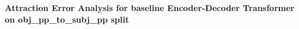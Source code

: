 \documentclass[11pt]{article}
\begin{document}
\textbf{Attraction Error Analysis for \cite{Wu2023} baseline Encoder-Decoder Transformer on obj\_pp\_to\_subj\_pp split}



\end{document}

